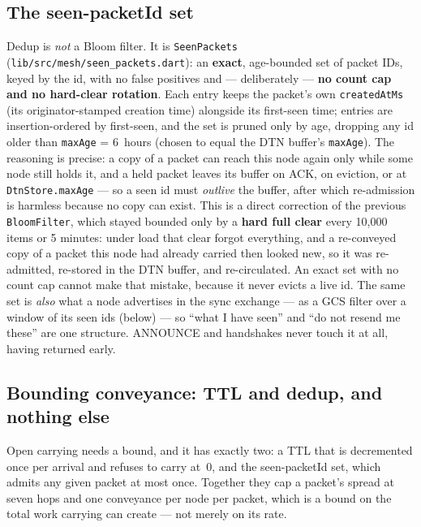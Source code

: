 \documentclass[11pt]{report}
\newcommand{\code}[1]{\texttt{\small #1}}
\begin{document}
\subsection*{The seen-packetId set}

Dedup is \emph{not} a Bloom filter. It is \code{SeenPackets} (\code{lib/src/mesh/seen\_packets.dart}): an \textbf{exact}, age-bounded set of packet IDs, keyed by the id, with no false positives and --- deliberately --- \textbf{no count cap and no hard-clear rotation}. Each entry keeps the packet's own \code{createdAtMs} (its originator-stamped creation time) alongside its first-seen time; entries are insertion-ordered by first-seen, and the set is pruned only by age, dropping any id older than \code{maxAge} = 6~hours (chosen to equal the DTN buffer's \code{maxAge}). The reasoning is precise: a copy of a packet can reach this node again only while some node still holds it, and a held packet leaves its buffer on ACK, on eviction, or at \code{DtnStore.maxAge} --- so a seen id must \emph{outlive} the buffer, after which re-admission is harmless because no copy can exist. This is a direct correction of the previous \code{BloomFilter}, which stayed bounded only by a \textbf{hard full clear} every 10{,}000 items or 5 minutes: under load that clear forgot everything, and a re-conveyed copy of a packet this node had already carried then looked new, so it was re-admitted, re-stored in the DTN buffer, and re-circulated. An exact set with no count cap cannot make that mistake, because it never evicts a live id. The same set is \emph{also} what a node advertises in the sync exchange --- as a GCS filter over a window of its seen ids (below) --- so ``what I have seen'' and ``do not resend me these'' are one structure. ANNOUNCE and handshakes never touch it at all, having returned early.

\subsection*{Bounding conveyance: TTL and dedup, and nothing else}

Open carrying needs a bound, and it has exactly two: a TTL that is decremented once per arrival and refuses to carry at~0, and the seen-packetId set, which admits any given packet at most once. Together they cap a packet's spread at seven hops and one conveyance per node per packet, which is a bound on the total work carrying can create --- not merely on its rate.
\end{document}
